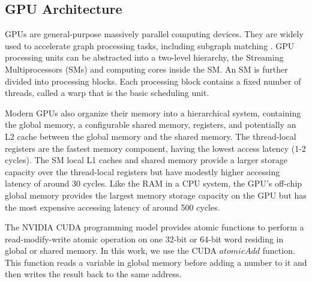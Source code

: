 
\subsection{GPU Architecture}
GPUs are general-purpose massively parallel computing devices. They are widely used to accelerate graph processing tasks, including
subgraph matching \FIXME{\cite{}}. GPU processing units can be abstracted into a two-level hierarchy, the Streaming Multiprocessors (SMs)
and computing cores inside the SM. An SM is further divided into processing blocks. Each processing block contains a fixed number of
threads, called a warp that is the basic scheduling unit.

Modern GPUs also organize their memory into a hierarchical system, containing the global memory, a configurable shared memory, registers,
and potentially an L2 cache between the global memory and the shared memory. The thread-local registers are the fastest memory component,
having the lowest access latency (1-2 cycles). The SM local L1 caches and shared memory provide a larger storage capacity over the
thread-local registers but have modestly higher accessing latency of around 30 cycles. Like the RAM in a CPU system, the GPU’s off-chip
global memory provides the largest memory storage capacity on the GPU but has the most expensive accessing latency of around 500 cycles.

The NVIDIA CUDA programming model provides atomic functions to perform a read-modify-write atomic operation on one 32-bit or 64-bit word
residing in global or shared memory. In this work, we use the CUDA $atomicAdd$ function. This function reads a variable in global memory
before adding a number to it and then writes the result back to the same address.



